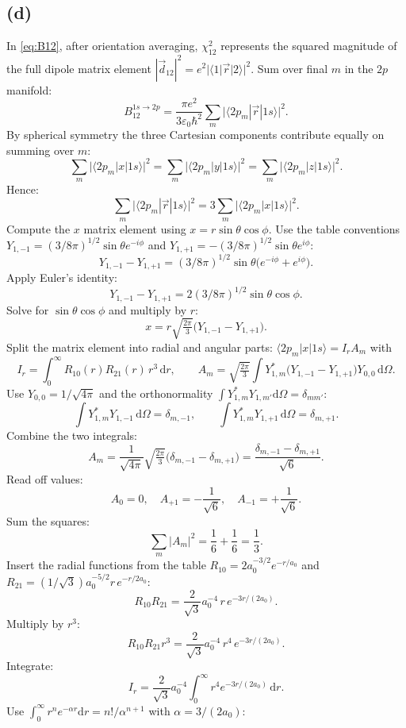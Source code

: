 \documentclass[11pt]{article}
\newcommand{\de}{\mathrm{d}}
\begin{document}
\subsection*{(d)}

In \eqref{eq:B12}, after orientation averaging, $\chi_{12}^2$ represents the squared magnitude of the full dipole matrix element $|\vec d_{12}|^2=e^2|\langle 1|\vec r|2\rangle|^2$. Sum over final $m$ in the $2p$ manifold:
\[
B_{12}^{1s\to 2p}=\frac{\pi e^2}{3\varepsilon_0\hbar^2}\sum_m\bigl|\langle 2p_m|\vec r|1s\rangle\bigr|^2.
\]
By spherical symmetry the three Cartesian components contribute equally on summing over $m$:
\[
\sum_m\bigl|\langle 2p_m|x|1s\rangle\bigr|^2=\sum_m\bigl|\langle 2p_m|y|1s\rangle\bigr|^2=\sum_m\bigl|\langle 2p_m|z|1s\rangle\bigr|^2.
\]
Hence:
\[
\sum_m\bigl|\langle 2p_m|\vec r|1s\rangle\bigr|^2=3\sum_m\bigl|\langle 2p_m|x|1s\rangle\bigr|^2.
\]
Compute the $x$ matrix element using $x=r\sin\theta\cos\phi$. Use the table conventions $Y_{1,-1}=(3/8\pi)^{1/2}\sin\theta e^{-i\phi}$ and $Y_{1,+1}=-(3/8\pi)^{1/2}\sin\theta e^{i\phi}$:
\[
Y_{1,-1}-Y_{1,+1}=(3/8\pi)^{1/2}\sin\theta\bigl(e^{-i\phi}+e^{i\phi}\bigr).
\]
Apply Euler's identity:
\[
Y_{1,-1}-Y_{1,+1}=2(3/8\pi)^{1/2}\sin\theta\cos\phi.
\]
Solve for $\sin\theta\cos\phi$ and multiply by $r$:
\[
x=r\sqrt{\tfrac{2\pi}{3}}\bigl(Y_{1,-1}-Y_{1,+1}\bigr).
\]
Split the matrix element into radial and angular parts: $\langle 2p_m|x|1s\rangle=I_r A_m$ with
\[
I_r=\!\int_0^\infty R_{10}(r)R_{21}(r)\,r^3\,\de r,\qquad A_m=\sqrt{\tfrac{2\pi}{3}}\!\int Y_{1,m}^*\bigl(Y_{1,-1}-Y_{1,+1}\bigr)Y_{0,0}\,\de\Omega.
\]
Use $Y_{0,0}=1/\sqrt{4\pi}$ and the orthonormality $\int Y_{1,m}^* Y_{1,m'}\de\Omega=\delta_{m m'}$:
\[
\int Y_{1,m}^* Y_{1,-1}\,\de\Omega=\delta_{m,-1},\qquad \int Y_{1,m}^* Y_{1,+1}\,\de\Omega=\delta_{m,+1}.
\]
Combine the two integrals:
\[
A_m=\frac{1}{\sqrt{4\pi}}\sqrt{\tfrac{2\pi}{3}}\bigl(\delta_{m,-1}-\delta_{m,+1}\bigr)=\frac{\delta_{m,-1}-\delta_{m,+1}}{\sqrt{6}}.
\]
Read off values:
\[
A_0=0,\quad A_{+1}=-\frac{1}{\sqrt{6}},\quad A_{-1}=+\frac{1}{\sqrt{6}}.
\]
Sum the squares:
\[
\sum_m|A_m|^2=\frac{1}{6}+\frac{1}{6}=\frac{1}{3}.
\]
Insert the radial functions from the table $R_{10}=2 a_0^{-3/2}e^{-r/a_0}$ and $R_{21}=(1/\sqrt{3})a_0^{-5/2} r\,e^{-r/2a_0}$:
\[
R_{10}R_{21}=\frac{2}{\sqrt{3}}a_0^{-4}\,r\,e^{-3r/(2a_0)}.
\]
Multiply by $r^3$:
\[
R_{10}R_{21}r^3=\frac{2}{\sqrt{3}}a_0^{-4}\,r^4\,e^{-3r/(2a_0)}.
\]
Integrate:
\[
I_r=\frac{2}{\sqrt{3}}a_0^{-4}\!\int_0^\infty r^4 e^{-3r/(2a_0)}\,\de r.
\]
Use $\int_0^\infty r^n e^{-\alpha r}\de r=n!/\alpha^{n+1}$ with $\alpha=3/(2a_0)$:
\end{document}
